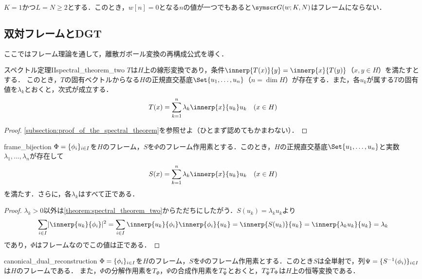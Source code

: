 \documentclass[../../main]{subfiles}
\begin{document}
\begin{example}
  \(K=1\)かつ\(L=N\geq 2\)とする．このとき，\(w[n]=0\)となる\(n\)の値が一つでもあると\(\gaborsys{w}{K}{N}\)はフレームにならない．
\end{example}

\subsection{双対フレームとDGT}

ここではフレーム理論を通して，離散ガボール変換の再構成公式を導く．

\begin{theorem}{スペクトル定理II}{spectral_theorem_two}
  \(T\)は\(H\)上の線形変換であり，条件\(\innerp{T(x)}{y}=\innerp{x}{T(y)}\)（\(x,y\in H\)）を満たすとする．
  このとき，\(T\)の固有ベクトルからなる\(H\)の正規直交基底\(\Set{u_1,\dots,u_n}\)（\(n=\dim H\)）が存在する．また，各\(u_k\)が属する\(T\)の固有値を\(\lambda_k\)とおくと，次式が成立する．
  \[
    T(x) = \sum_{k=1}^n\lambda_k\innerp{x}{u_k}u_k\quad(x\in H)
  \]
\end{theorem}

\begin{proof}
  \cref{subsection:proof_of_the_spectral_theorem}を参照せよ（ひとまず認めてもかまわない）．
\end{proof}

\begin{corollary}{}{frame_bijection}
  \(\Phi=\lbrace\phi_i\rbrace_{i\in I}\)を\(H\)のフレーム，\(S\)を\(\Phi\)のフレーム作用素とする．このとき，\(H\)の正規直交基底\(\Set{u_1,\dots,u_n}\)と実数\(\lambda_1,\dots,\lambda_n\)が存在して
  \[
    S(x) = \sum_{k=1}^n\lambda_k\innerp{x}{u_k}u_k\quad(x\in H)
  \]
  を満たす．さらに，各\(\lambda_k\)はすべて正である．
\end{corollary}

\begin{proof}
  \(\lambda_k>0\)以外は\cref{theorem:spectral_theorem_two}からただちにしたがう．\(S(u_k)=\lambda_ku_k\)より
  \[
    \sum_{i\in I}\abs{\innerp{u_k}{\phi_i}}^2 = \sum_{i\in I}\innerp{u_k}{\phi_i}\innerp{\phi_i}{u_k}
    = \innerp{S(u_k)}{u_k}
    = \innerp{\lambda_ku_k}{u_k}
    = \lambda_k
  \]
  であり，\(\Phi\)はフレームなのでこの値は正である．
\end{proof}

\begin{proposition}{}{canonical_dual_reconstruction}
  \(\Phi=\lbrace\phi_i\rbrace_{i\in I}\)を\(H\)のフレーム，\(S\)を\(\Phi\)のフレーム作用素とする．このとき\(S\)は全単射で，列\(\Psi=\lbrace S^{-1}(\phi_i)\rbrace_{i\in I}\)は\(H\)のフレームである．
  また，\(\Phi\)の分解作用素を\(T_\Phi\)，\(\Psi\)の合成作用素を\(T_\Psi^{\mathord{\ast}}\)とおくと，\(T_\Psi^{\mathord{\ast}}T_\Phi\)は\(H\)上の恒等変換である．
\end{proposition}
\end{document}

